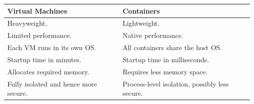 \documentclass[10pt, a4paper]{article}
\begin{document}
\begin{table}[h]
    \begin{tabular}{|l|l|}
    \hline
    \textbf{Virtual Machines}             & \textbf{Containers}                            \\ \hline
    Heavyweight.                          & Lightweight.                                   \\
    Limited performance.                  & Native performance.                            \\
    Each VM runs in its own OS.           & All containers share the host OS.              \\
    Startup time in minutes.              & Startup time in milliseconds.                  \\
    Allocates required memory.            & Requires less memory space.                    \\
    Fully isolated and hence more secure. & Process-level isolation, possibly less secure. \\ \hline
    \end{tabular}
\end{table}




\printbibliography
\end{document}
